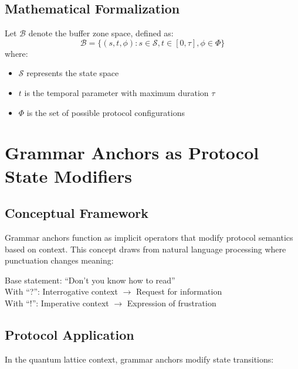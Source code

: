 \documentclass[12pt,a4paper]{article}
\begin{document}
\subsection{Mathematical Formalization}

Let $\mathcal{B}$ denote the buffer zone space, defined as:
\begin{equation}
\mathcal{B} = \{(s, t, \phi) : s \in \mathcal{S}, t \in [0, \tau], \phi \in \Phi\}
\end{equation}
where:
\begin{itemize}
    \item $\mathcal{S}$ represents the state space
    \item $t$ is the temporal parameter with maximum duration $\tau$
    \item $\Phi$ is the set of possible protocol configurations
\end{itemize}

\section{Grammar Anchors as Protocol State Modifiers}

\subsection{Conceptual Framework}

Grammar anchors function as implicit operators that modify protocol semantics based on context. This concept draws from natural language processing where punctuation changes meaning:

\begin{tcolorbox}[colback=green!5!white,colframe=green!75!black,title=Natural Language Analogy]
Base statement: ``Don't you know how to read''\\
With ``?'': Interrogative context $\rightarrow$ Request for information\\
With ``!'': Imperative context $\rightarrow$ Expression of frustration
\end{tcolorbox}

\subsection{Protocol Application}

In the quantum lattice context, grammar anchors modify state transitions:
\end{document}
